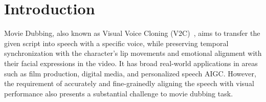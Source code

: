 \section{Introduction}
Movie Dubbing, also known as Visual Voice Cloning (V2C)~\cite{V2C}, aims to transfer the given script into speech with a specific voice, while preserving temporal synchronization with the character’s lip movements and emotional alignment with their facial expressions in the video.
It has broad real-world applications in areas such as film production, digital media, and personalized speech AIGC.
However, the requirement of accurately and fine-grainedly aligning the speech with visual performance also presents a substantial challenge to movie dubbing task.

